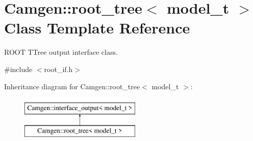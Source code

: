 \hypertarget{a00470}{\section{Camgen\-:\-:root\-\_\-tree$<$ model\-\_\-t $>$ Class Template Reference}
\label{a00470}
}


R\-O\-O\-T T\-Tree output interface class.  




{\ttfamily \#include $<$root\-\_\-if.\-h$>$}

Inheritance diagram for Camgen\-:\-:root\-\_\-tree$<$ model\-\_\-t $>$\-:\begin{figure}[H]
\begin{center}
\leavevmode
\includegraphics[height=2.000000cm]{a00470}
\end{center}
\end{figure}
